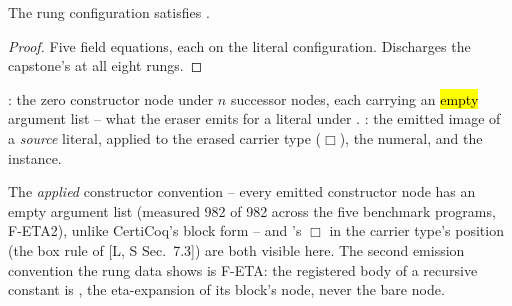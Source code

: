 \begin{lemma}\label{lem:Green-spike_configPinned}
 \leanok
{}
The rung configuration satisfies .
\end{lemma}

\begin{proof} \leanok
{}
 Five field equations, each  on the literal configuration. Discharges the
capstone's  at all eight rungs.
\end{proof}

\begin{definition}\label{def:Green-peanoLB}
 \leanok
{}
 : the zero constructor node under $n$ successor nodes, each carrying
an \hl{empty} argument list -- what the eraser emits for a  literal under
. : the emitted image of a \emph{source} literal, 
applied to the erased carrier type ($\Box$), the numeral, and the instance.
\end{definition}

\begin{remark}
The \emph{applied} constructor convention -- every emitted constructor node has an empty argument
list (measured 982 of 982 across the five benchmark programs, F-ETA2), unlike CertiCoq's block form
-- and 's $\Box$ in the carrier type's position (the box rule of [L, S Sec.~7.3]) are
both visible here. The second emission convention the rung data shows is F-ETA: the registered body of a
recursive constant is , the eta-expansion of its block's node, never the bare
node.
\end{remark}

